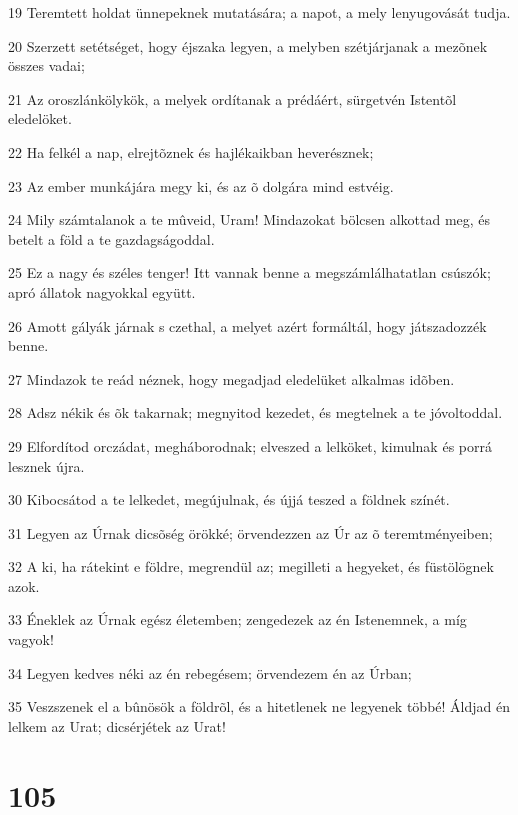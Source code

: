 \par 19 Teremtett holdat ünnepeknek mutatására; a napot, a mely lenyugovását tudja.
\par 20 Szerzett setétséget, hogy éjszaka legyen, a melyben szétjárjanak a mezõnek összes vadai;
\par 21 Az oroszlánkölykök, a melyek ordítanak a prédáért, sürgetvén Istentõl eledelöket.
\par 22 Ha felkél a nap, elrejtõznek és hajlékaikban heverésznek;
\par 23 Az ember munkájára megy ki, és az õ dolgára mind estvéig.
\par 24 Mily számtalanok a te mûveid, Uram! Mindazokat bölcsen alkottad meg, és betelt a föld a te gazdagságoddal.
\par 25 Ez a nagy és széles tenger! Itt vannak benne a megszámlálhatatlan csúszók; apró állatok nagyokkal együtt.
\par 26 Amott gályák járnak s czethal, a melyet azért formáltál, hogy játszadozzék benne.
\par 27 Mindazok te reád néznek, hogy megadjad eledelüket alkalmas idõben.
\par 28 Adsz nékik és õk takarnak; megnyitod kezedet, és megtelnek a te jóvoltoddal.
\par 29 Elfordítod orczádat, megháborodnak; elveszed a lelköket, kimulnak és porrá lesznek újra.
\par 30 Kibocsátod a te lelkedet, megújulnak, és újjá teszed a földnek színét.
\par 31 Legyen az Úrnak dicsõség örökké; örvendezzen az Úr az õ teremtményeiben;
\par 32 A ki, ha rátekint e földre, megrendül az; megilleti a hegyeket, és füstölögnek azok.
\par 33 Éneklek az Úrnak egész életemben; zengedezek az én Istenemnek, a míg vagyok!
\par 34 Legyen kedves néki az én rebegésem; örvendezem én az Úrban;
\par 35 Veszszenek el a bûnösök a földrõl, és a hitetlenek ne legyenek többé! Áldjad én lelkem az Urat; dicsérjétek az Urat!

\chapter{105}

